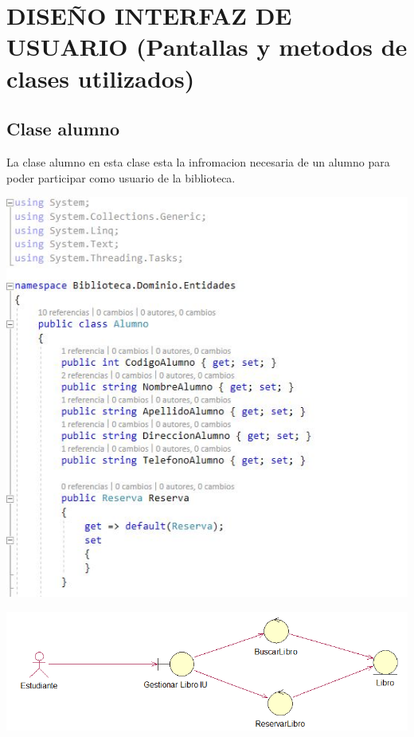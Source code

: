 \section{ DISEÑO INTERFAZ DE USUARIO (Pantallas y metodos de clases utilizados)} 
  \subsection{Clase alumno}
  La clase alumno en esta clase esta la infromacion necesaria de un alumno para poder participar como usuario de la biblioteca.
	\begin{center}
	\includegraphics[width=14cm]{./Imagenes/img101} 
	\end{center}

	\begin{center}
	\includegraphics[width=18cm]{./Imagenes/img10} 
	\end{center}
	
 \newpage
